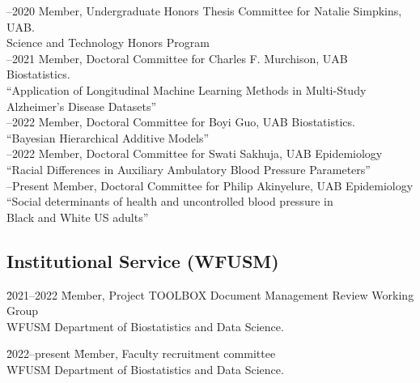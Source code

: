 \documentclass[11pt]{cv_wakeforest_article}
\newcommand{\AR}[1]{#1}  %
\newcommand{\mysubsection}[1]{\subsection*{#1}}
\begin{document}
\begin{tabbing}
--2020 \>Member, Undergraduate Honors Thesis Committee for Natalie Simpkins, UAB.\\\>\>\hspace{0.25in}Science and Technology Honors Program \\

--2021 \>Member, Doctoral Committee for Charles F. Murchison, UAB Biostatistics.\\\>\>\hspace{0.25in}``Application of Longitudinal Machine Learning Methods in Multi-Study\\\>\>\hspace{0.275in} Alzheimer's Disease Datasets'' \\

--2022 \>Member, Doctoral Committee for Boyi Guo, UAB Biostatistics.\\\>\>\hspace{0.25in}``Bayesian Hierarchical Additive Models'' \\

--2022 \>Member, Doctoral Committee for Swati Sakhuja, UAB Epidemiology\\\>\>\hspace{0.25in}``Racial Differences in Auxiliary Ambulatory Blood Pressure Parameters''\\

--Present \>\AR{Member, Doctoral Committee for Philip Akinyelure}, UAB Epidemiology\\\>\>\hspace{0.25in}``Social determinants of health and uncontrolled blood pressure in\\\>\>\hspace{0.275in}Black and White US adults''

\end{tabbing}

\mysubsection{Institutional  Service (WFUSM)}
\begin{tabbing}

\hspace{0.25in} \= 2021--2022\hspace{0.25in} \=\AR{Member, Project TOOLBOX Document Management Review Working Group} \\\>\>\hspace{0.25in}WFUSM Department of Biostatistics and Data Science.

\hspace{0.25in} \= 2022--present\hspace{0.25in} \=\AR{Member, Faculty recruitment committee} \\\>\>\hspace{0.25in}WFUSM Department of Biostatistics and Data Science.

\end{tabbing}
\end{document}
